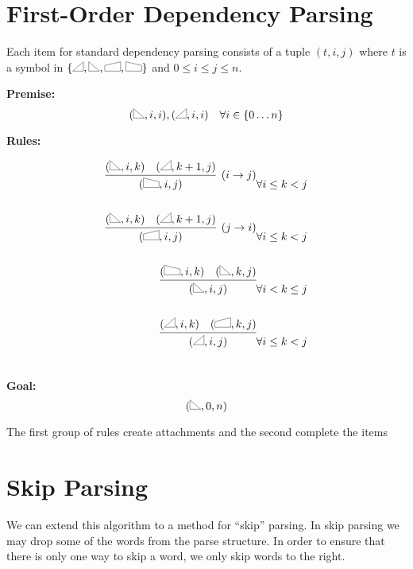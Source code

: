 \documentclass{article}
\begin{document}
\newcommand{\rtri}{\scalebox{0.2}{\tikz{
    \coordinate (A) at (0,0);
    \coordinate (B) at (90:1.5cm);
    \coordinate (C) at (180:-1.7cm);
    \draw[line width = 0.05cm] (A)--(B)--(C)--cycle;
    }}}

\newcommand{\ltri}{\scalebox{0.2}{\tikz{
    \coordinate (A) at (0,0);
    \coordinate (B) at (90:1.5cm);
    \coordinate (C) at (180:1.7cm);
    \draw[line width = 0.05cm] (A)--(B)--(C)--cycle;
    }}}


\section{First-Order Dependency Parsing }

Each item for standard dependency parsing consists of a tuple $(t, i, j)$ where $t$ is a symbol in $\{\ltri,\rtri, \ltrap, \rtrap \}$  and $0\leq i \leq j \leq n$. 

\noindent \textbf{Premise:}
\[(\rtri, i,i), (\ltri, i,i)\ \ \  \forall i \in \{0 \ldots n\}\]


\noindent\textbf{Rules:}

\begin{eqnarray*}
\infer[(i \rightarrow j)]{(\rtrap, i,j)}{(\rtri, i,k)  &  (\ltri, k+1, j) } &  \forall i\leq k < j \\\\
\infer[(j \rightarrow i)]{(\ltrap, i,j)}{(\rtri, i,k)  &  (\ltri, k+1, j) } & \forall i\leq k < j \\\\
\infer{(\rtri, i,j)}{(\rtrap, i,k)  &  (\rtri, k, j) }    &  \forall i<  k \leq j \\\\
\infer{(\ltri, i,j)}{(\ltri, i,k)  &  (\ltrap, k, j) }  & \forall i\leq k < j \\\\
\end{eqnarray*}

\noindent \textbf{Goal:}\[ (\rtri, 0,n)\]

The first group of rules create attachments and the second complete the items

\pagebreak
\section{Skip Parsing}

We can extend this algorithm to a method for ``skip'' parsing. In skip parsing we may drop some of the words from the parse structure. In order to ensure that there is only one way to skip a word, we only skip words to the right. 
\end{document}
